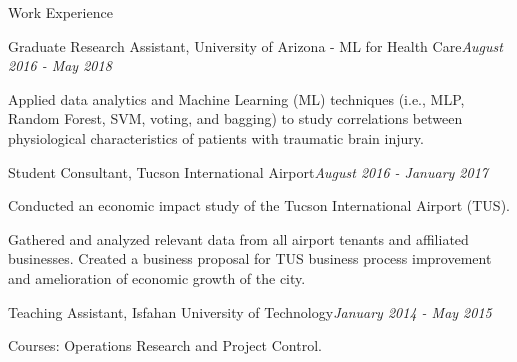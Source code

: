 \documentclass{resume} %
\begin{document}
\begin{rSection}{Work Experience}

\begin{rSubsection}{Graduate Research Assistant, University of Arizona - ML for Health Care}{\em August 2016 - May 2018}{}{}%
\item Applied data analytics and Machine Learning (ML) techniques (i.e., MLP, Random Forest, SVM, voting, and bagging) to study correlations between physiological characteristics of patients with traumatic brain injury.
\end{rSubsection}


\begin{rSubsection}{Student Consultant, Tucson International Airport}{\em August 2016 - January 2017}{}{}
\item Conducted an economic impact study of the Tucson International Airport (TUS).
\item Gathered and analyzed relevant data from all airport tenants and affiliated businesses. Created a business proposal for TUS business process improvement and amelioration of economic growth of the city.
\end{rSubsection}



\begin{rSubsection}{Teaching Assistant, Isfahan University of Technology}{\em January 2014 - May 2015}{}{}
\item Courses:  Operations Research and Project Control.
\end{rSubsection}



\end{rSection}


\end{document}
